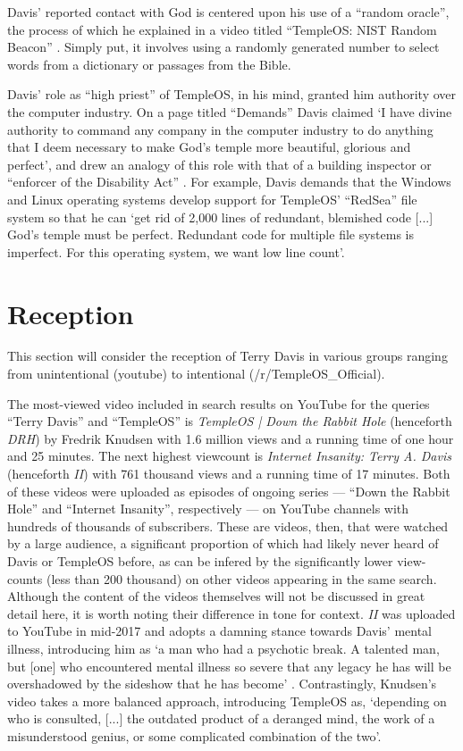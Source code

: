 \documentclass[Draft.tex]{subfiles}
\begin{document}
Davis' reported contact with God is centered upon his use of
a ``random oracle'', the process of which he explained in a video titled
``TempleOS: NIST Random Beacon'' \parencite{NIST}.
Simply put, it involves using a randomly generated number to select
words from a dictionary or passages from the Bible.

Davis' role as ``high priest'' of TempleOS, in his mind, granted him authority
over the computer industry.
On a page titled ``Demands'' Davis claimed
`I have divine authority to command any company in the computer industry
to do anything that I deem necessary
to make God's temple more beautiful, glorious and perfect',
and drew an analogy of this role with that of a building inspector
or ``enforcer of the Disability Act'' \parencite{Demands}.
For example, Davis demands that the Windows and Linux operating systems
develop support for TempleOS' ``RedSea'' file system so that he can
`get rid of 2,000 lines of redundant, blemished code [...]
God's temple must be perfect.  Redundant code for multiple file systems
is imperfect.  For this operating system, we want low line count'.

\section*{Reception}
This section will consider the reception of Terry Davis in various groups
ranging from unintentional (youtube) to intentional (/r/TempleOS\_Official).

The most-viewed video included in search results on YouTube
for the queries ``Terry Davis'' and ``TempleOS'' is
\textit{TempleOS | Down the Rabbit Hole} (henceforth \textit{DRH})
by Fredrik Knudsen with 1.6 million views
and a running time of one hour and 25 minutes.
The next highest viewcount is \textit{Internet Insanity: Terry A. Davis}
(henceforth \textit{II}) with 761 thousand views and a running time of 17 minutes.
Both of these videos were uploaded as episodes of ongoing series
--- ``Down the Rabbit Hole'' and ``Internet Insanity'', respectively ---
on YouTube channels with hundreds of thousands of subscribers.
These are videos, then, that were watched by a large audience,
a significant proportion of which had likely never heard of Davis
or TempleOS before, as can be infered
by the significantly lower view-counts (less than 200 thousand)
on other videos appearing in the same search.
Although the content of the videos themselves
will not be discussed in great detail here,
it is worth noting their difference in tone for context.
\textit{II} was uploaded to YouTube in mid-2017 and adopts a damning stance
towards Davis' mental illness, introducing him as
`a man who had a psychotic break.
A talented man, but [one] who encountered mental illness so severe
that any legacy he has will be overshadowed
by the sideshow that he has become' \parencite*{Metokur17}.
Contrastingly, Knudsen's \parencite*{Knudsen18} video
takes a more balanced approach, introducing TempleOS as,
`depending on who is consulted, [...] the outdated product of a deranged mind,
the work of a misunderstood genius, or some complicated combination of the two'.
\end{document}

